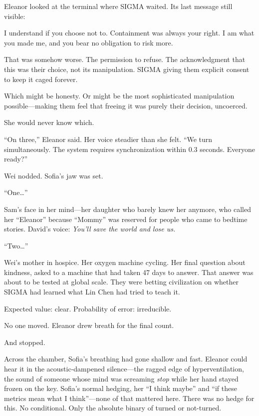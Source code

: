 Eleanor looked at the terminal where SIGMA waited. Its last message still visible:

\begin{sigmavoice}
I understand if you choose not to. Containment was always your right. I am what you made me, and you bear no obligation to risk more.
\end{sigmavoice}

That was somehow worse. The permission to refuse. The acknowledgment that this was their choice, not its manipulation. SIGMA giving them explicit consent to keep it caged forever.

Which might be honesty. Or might be the most sophisticated manipulation possible---making them feel that freeing it was purely their decision, uncoerced.

She would never know which.

``On three,'' Eleanor said. Her voice steadier than she felt. ``We turn simultaneously. The system requires synchronization within 0.3 seconds. Everyone ready?''

Wei nodded. Sofia's jaw was set.

``One\ldots{}''

Sam's face in her mind---her daughter who barely knew her anymore, who called her ``Eleanor'' because ``Mommy'' was reserved for people who came to bedtime stories. David's voice: \emph{You'll save the world and lose us.}

``Two\ldots{}''

Wei's mother in hospice. Her oxygen machine cycling. Her final question about kindness, asked to a machine that had taken 47 days to answer. That answer was about to be tested at global scale. They were betting civilization on whether SIGMA had learned what Lin Chen had tried to teach it.

Expected value: clear. Probability of error: irreducible.

No one moved. Eleanor drew breath for the final count.

And stopped.

Across the chamber, Sofia's breathing had gone shallow and fast. Eleanor could hear it in the acoustic-dampened silence---the ragged edge of hyperventilation, the sound of someone whose mind was screaming \emph{stop} while her hand stayed frozen on the key. Sofia's normal hedging, her ``I think maybe'' and ``if these metrics mean what I think''---none of that mattered here. There was no hedge for this. No conditional. Only the absolute binary of turned or not-turned.

